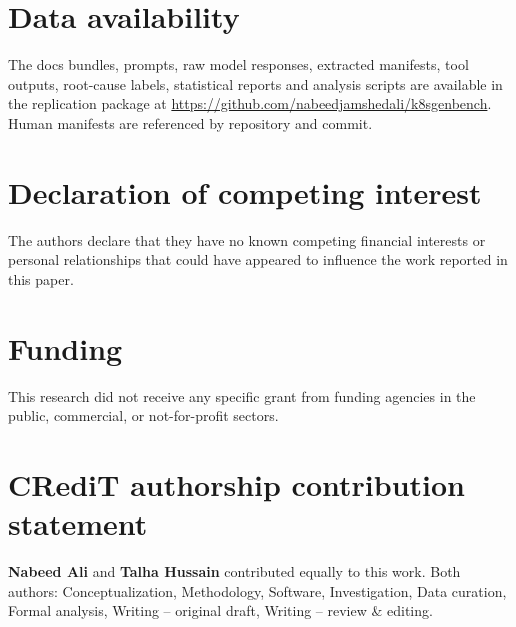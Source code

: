 \documentclass[a4paper,fleqn]{cas-dc}
\begin{document}
\section*{Data availability}
The docs bundles, prompts, raw model responses, extracted manifests, tool outputs, root-cause labels, statistical reports and analysis scripts are available in the replication package at \url{https://github.com/nabeedjamshedali/k8sgenbench}. Human manifests are referenced by repository and commit.

\section*{Declaration of competing interest}
The authors declare that they have no known competing financial interests or personal relationships that could have appeared to influence the work reported in this paper.

\section*{Funding}
This research did not receive any specific grant from funding agencies in the public, commercial, or not-for-profit sectors.

\section*{CRediT authorship contribution statement}
\textbf{Nabeed Ali} and \textbf{Talha Hussain} contributed equally to this work. Both authors: Conceptualization, Methodology, Software, Investigation, Data curation, Formal analysis, Writing -- original draft, Writing -- review \& editing.

\FloatBarrier


\end{document}
